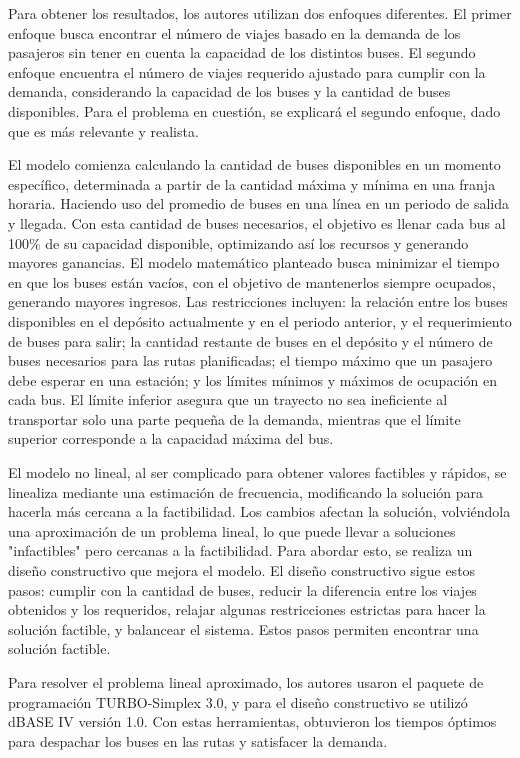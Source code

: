 \documentclass[preprint,11pt]{elsarticle}
\begin{document}
Para obtener los resultados, los autores utilizan dos enfoques diferentes. El primer enfoque busca encontrar el número de viajes basado en la demanda de los pasajeros sin tener en cuenta la capacidad de los distintos buses. El segundo enfoque encuentra el número de viajes requerido ajustado para cumplir con la demanda, considerando la capacidad de los buses y la cantidad de buses disponibles. Para el problema en cuestión, se explicará el segundo enfoque, dado que es más relevante y realista.

El modelo comienza calculando la cantidad de buses disponibles en un momento específico, determinada a partir de la cantidad máxima y mínima en una franja horaria. Haciendo uso del promedio de buses en una línea en un periodo de salida y llegada. Con esta cantidad de buses necesarios, el objetivo es llenar cada bus al 100\% de su capacidad disponible, optimizando así los recursos y generando mayores ganancias. El modelo matemático planteado busca minimizar el tiempo en que los buses están vacíos, con el objetivo de mantenerlos siempre ocupados, generando mayores ingresos. Las restricciones incluyen: la relación entre los buses disponibles en el depósito actualmente y en el periodo anterior, y el requerimiento de buses para salir; la cantidad restante de buses en el depósito y el número de buses necesarios para las rutas planificadas; el tiempo máximo que un pasajero debe esperar en una estación; y los límites mínimos y máximos de ocupación en cada bus. El límite inferior asegura que un trayecto no sea ineficiente al transportar solo una parte pequeña de la demanda, mientras que el límite superior corresponde a la capacidad máxima del bus.

El modelo no lineal, al ser complicado para obtener valores factibles y rápidos, se linealiza mediante una estimación de frecuencia, modificando la solución para hacerla más cercana a la factibilidad. Los cambios afectan la solución, volviéndola una aproximación de un problema lineal, lo que puede llevar a soluciones "infactibles" pero cercanas a la factibilidad. Para abordar esto, se realiza un diseño constructivo que mejora el modelo. El diseño constructivo sigue estos pasos: cumplir con la cantidad de buses, reducir la diferencia entre los viajes obtenidos y los requeridos, relajar algunas restricciones estrictas para hacer la solución factible, y balancear el sistema. Estos pasos permiten encontrar una solución factible.

Para resolver el problema lineal aproximado, los autores usaron el paquete de programación TURBO-Simplex 3.0, y para el diseño constructivo se utilizó dBASE IV versión 1.0. Con estas herramientas, obtuvieron los tiempos óptimos para despachar los buses en las rutas y satisfacer la demanda.
\end{document}
